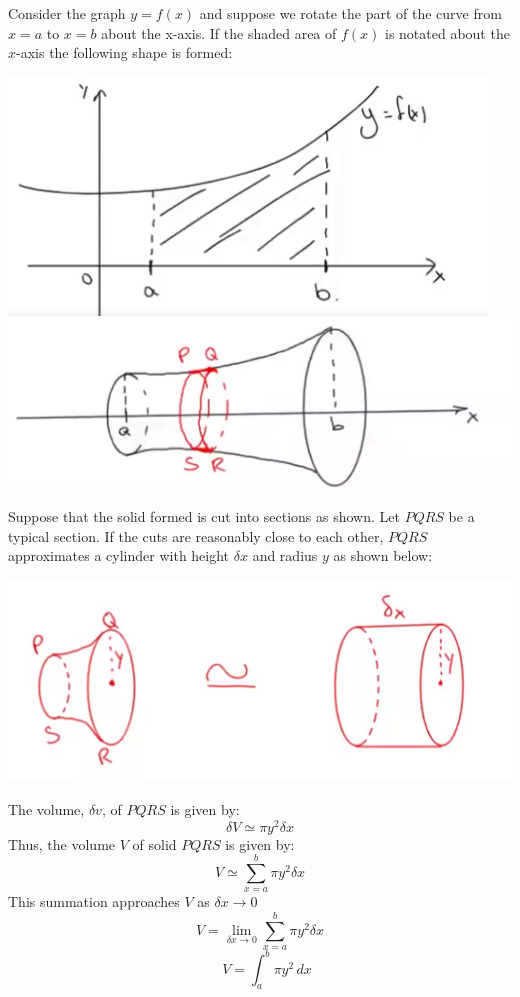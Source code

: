 \documentclass[12pt, a4paper]{report}
\theoremstyle{definition}
\begin{document}
Consider the graph $y=f(x)$ and suppose we  rotate the part of the curve from $x=a$ to $x=b$ about the x-axis. If the shaded area of $f(x)$ is notated about the $x$-axis the following shape is formed:
\begin{center}
	\begin{multicols}{2}
		\includegraphics[scale=0.5]{app_of_calc_integ_1}
		\includegraphics[scale=0.5]{app_of_calc_integ_2}
	\end{multicols}
\end{center}

Suppose that the solid formed is cut into sections as shown. Let $PQRS$ be a typical section. If the cuts are reasonably close to each other, $PQRS$ approximates a cylinder with height $\delta x$ and radius $y$ as shown below:
\begin{center}
	\includegraphics[scale=1]{app_of_calc_integ_3}
\end{center}
The volume, $\delta v$, of $PQRS$ is given by:
$$\delta V \simeq \pi y^2 \delta x$$
Thus, the volume $V$ of solid $PQRS$ is given by:
$$V\simeq \sum_{x=a}^{b} \pi y^2 \delta x$$
This summation approaches $V$ as $\delta x \to 0$
$$V = \lim\limits_{\delta x \to 0}   \sum_{x=a}^{b} \pi y^2 \delta x$$
$$\quad\boxed{V = \int_{a}^{b} \pi y^2 \, dx}$$
	
\end{document}

